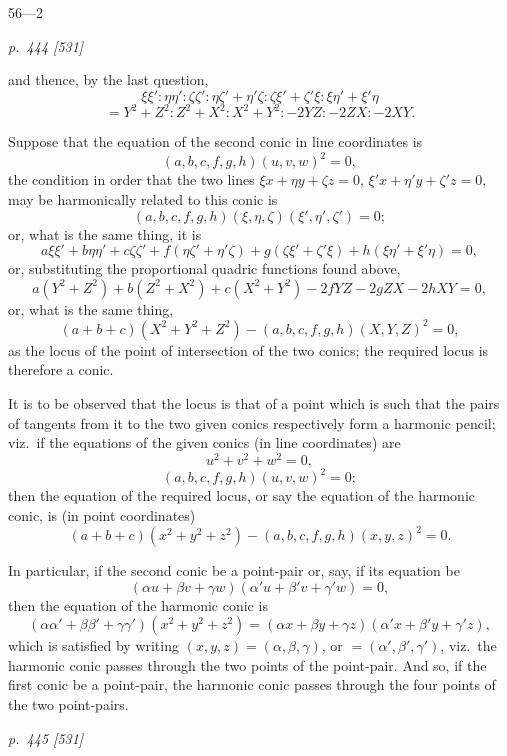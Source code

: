 \documentclass[11pt,a4paper]{article}
\theoremstyle{plain}
\theoremstyle{definition}
\begin{document}
\hfill 56---2

\clearpage

\bigskip
\textit{p.~444 [531]}
\smallskip

and thence, by the last question,
\[
\xi\xi' : \eta\eta' : \zeta\zeta' : \eta\zeta' + \eta'\zeta : \zeta\xi' + \zeta'\xi : \xi\eta' + \xi'\eta
\]
\[
= Y^2 + Z^2 : Z^2 + X^2 : X^2 + Y^2 : -2YZ : -2ZX : -2XY.
\]

Suppose that the equation of the second conic in line coordinates is
\[
(a, b, c, f, g, h)(u, v, w)^2 = 0,
\]
the condition in order that the two lines $\xi x + \eta y + \zeta z = 0$, $\xi' x + \eta' y + \zeta' z = 0$, may be
harmonically related to this conic is
\[
(a, b, c, f, g, h)(\xi, \eta, \zeta)(\xi', \eta', \zeta') = 0;
\]
or, what is the same thing, it is
\[
a\xi\xi' + b\eta\eta' + c\zeta\zeta'
+ f(\eta\zeta' + \eta'\zeta)
+ g(\zeta\xi' + \zeta'\xi)
+ h(\xi\eta' + \xi'\eta)=0,
\]
or, substituting the proportional quadric functions found above,
\[
a(Y^2+Z^2)+b(Z^2+X^2)+c(X^2+Y^2)-2fYZ-2gZX-2hXY=0,
\]
or, what is the same thing,
\[
(a + b + c)(X^2 + Y^2 + Z^2) - (a, b, c, f, g, h)(X, Y, Z)^2 = 0,
\]
as the locus of the point of intersection of the two conics; the required locus is therefore a conic.

It is to be observed that the locus is that of a point which is such that the
pairs of tangents from it to the two given conics respectively form a harmonic pencil;
viz.\ if the equations of the given conics (in line coordinates) are
\[
u^2 + v^2 + w^2 = 0,
\]
\[
(a, b, c, f, g, h)(u, v, w)^2 = 0;
\]
then the equation of the required locus, or say the equation of the harmonic conic, is
(in point coordinates)
\[
(a + b + c)(x^2 + y^2 + z^2) - (a, b, c, f, g, h)(x, y, z)^2 = 0.
\]

In particular, if the second conic be a point-pair or, say, if its equation be
\[
(\alpha u + \beta v + \gamma w)(\alpha' u + \beta' v + \gamma' w) = 0,
\]
then the equation of the harmonic conic is
\[
(\alpha\alpha' + \beta\beta' + \gamma\gamma')(x^2 + y^2 + z^2) = (\alpha x + \beta y + \gamma z)(\alpha' x + \beta' y + \gamma' z),
\]
which is satisfied by writing $(x, y, z) = (\alpha, \beta, \gamma)$, or $= (\alpha', \beta', \gamma')$, viz.\ the harmonic
conic passes through the two points of the point-pair. And so, if the first conic be
a point-pair, the harmonic conic passes through the four points of the two point-pairs.

\clearpage

\bigskip
\textit{p.~445 [531]}
\smallskip
\end{document}

